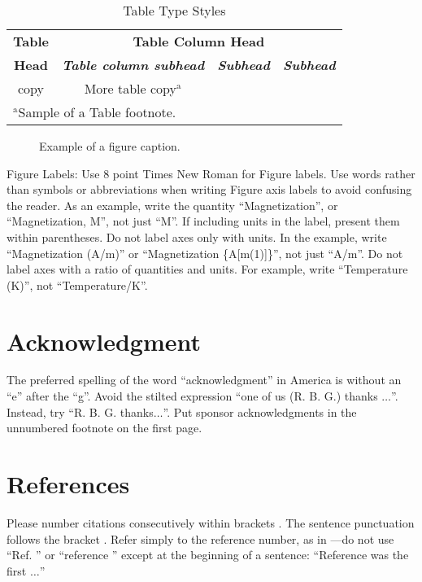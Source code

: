 \documentclass[conference]{IEEEtran}
\begin{document}
\begin{table}[htbp]
\caption{Table Type Styles}
\begin{center}
\begin{tabular}{|c|c|c|c|}
\hline
\textbf{Table}&\multicolumn{3}{|c|}{\textbf{Table Column Head}} \\
\cline{2-4} 
\textbf{Head} & \textbf{\textit{Table column subhead}}& \textbf{\textit{Subhead}}& \textbf{\textit{Subhead}} \\
\hline
copy& More table copy$^{\mathrm{a}}$& &  \\
\hline
\multicolumn{4}{l}{$^{\mathrm{a}}$Sample of a Table footnote.}
\end{tabular}
\label{tab1}
\end{center}
\end{table}

\begin{figure}[htbp]
\caption{Example of a figure caption.}
\label{fig}
\end{figure}

Figure Labels: Use 8 point Times New Roman for Figure labels. Use words 
rather than symbols or abbreviations when writing Figure axis labels to 
avoid confusing the reader. As an example, write the quantity 
``Magnetization'', or ``Magnetization, M'', not just ``M''. If including 
units in the label, present them within parentheses. Do not label axes only 
with units. In the example, write ``Magnetization (A/m)'' or ``Magnetization 
\{A[m(1)]\}'', not just ``A/m''. Do not label axes with a ratio of 
quantities and units. For example, write ``Temperature (K)'', not 
``Temperature/K''.

\section*{Acknowledgment}

The preferred spelling of the word ``acknowledgment'' in America is without 
an ``e'' after the ``g''. Avoid the stilted expression ``one of us (R. B. 
G.) thanks $\ldots$''. Instead, try ``R. B. G. thanks$\ldots$''. Put sponsor 
acknowledgments in the unnumbered footnote on the first page.

\section*{References}

Please number citations consecutively within brackets . The 
sentence punctuation follows the bracket  . Refer simply to the reference 
number, as in ---do not use ``Ref.  '' or ``reference  '' except at 
the beginning of a sentence: ``Reference was the first $\ldots$''
\end{document}
